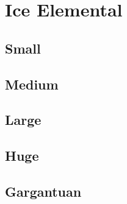 \section{Ice Elemental}

\subsection{Small}

\subsection{Medium}

\subsection{Large}

\subsection{Huge}

\subsection{Gargantuan}